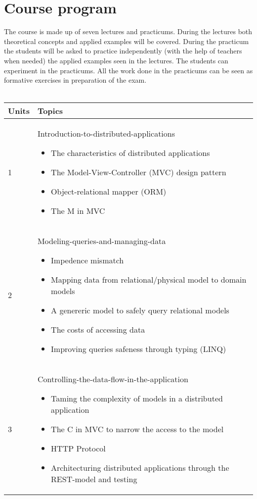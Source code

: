 \section{Course program}
The course is made up of seven lectures and practicums. During the lectures both theoretical
concepts and applied examples will be covered. During the practicum the students will be
asked to practice independently (with the help of teachers when needed) the applied examples
seen in the lectures. The students can experiment in the practicums. All the work done in the
practicums can be seen as formative exercises in preparation of the exam.  
	\\
	\\
	\begin{tabular}{ | p{1.2cm} | p{10cm} | }
		\hline
	  	\textbf{Units} & \textbf{Topics} \\
	  	\hline 
  		1 & Introduction-to-distributed-applications
  			\begin{itemize}[nolistsep]
				\item The characteristics of distributed applications
				\item The Model-View-Controller (MVC) design pattern 
				\item Object-relational mapper (ORM)
				\item The M in MVC
			\end{itemize}
 		\\
  		\hline
  		2 & Modeling-queries-and-managing-data
  		\begin{itemize}[nolistsep]
					\item Impedence mismatch
					\item Mapping data from relational/physical model to domain models
					\item A genereric model to safely query relational models
					\item The costs of accessing data
					\item Improving queries safeness through typing (LINQ)
				\end{itemize}
  		\\
  		\hline
  		3 & Controlling-the-data-flow-in-the-application
  		\begin{itemize}[nolistsep]
					\item Taming the complexity of models in a distributed application
					\item The C in MVC to narrow the access to the model
					\item HTTP Protocol
					\item Architecturing distributed applications through the REST-model and testing

\end{itemize}
\end{tabular}
